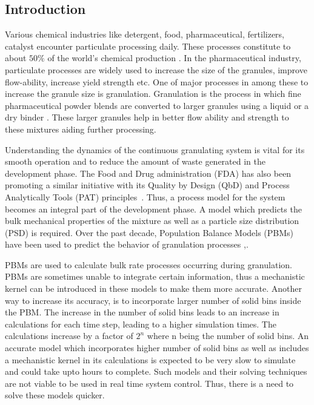 \documentclass[preprint,10pt,authoryear]{elsarticle}
\begin{document}
\begin{linenumbers}
\section{Introduction}
\label{secIntro}
Various chemical industries like detergent, food, pharmaceutical, fertilizers, catalyst encounter particulate processing daily. 
These processes constitute to about $50\%$ of the world's chemical production \citep{seville1997}.
In the pharmaceutical industry, particulate processes are widely used to increase 
the size of the granules, improve flow-ability, increase yield strength etc. One of 
major processes in among these to increase the granule size is granulation. 
Granulation is the process in which fine pharmaceutical powder 
blends are converted to larger granules using a liquid or a dry binder \citep{Chaturbedi2017}. 
These larger granules help in better flow ability and strength to these mixtures 
aiding further processing. 


Understanding the dynamics of the continuous granulating system is vital for its smooth 
operation and to reduce the amount of waste generated in the development phase. The Food 
and Drug administration (FDA) has also been promoting a similar initiative with its 
Quality by Design (QbD) and Process Analytically Tools (PAT) principles~\citep{sen2014}. 
Thus, a process model for the system becomes an integral part of the development phase. 
A model which predicts the bulk mechanical properties of the mixture as well as a particle size 
distribution (PSD) is required. Over the past decade, Population Balance Models (PBMs) have been used 
to predict the behavior of granulation processes \citep{Barrasso2013},\citep{Ramachandran2009}. 

PBMs are used to calculate bulk rate processes occurring during granulation. PBMs are sometimes 
unable to integrate certain information, thus a mechanistic kernel can be 
introduced in these models to make them more accurate. Another way to increase its accuracy, 
is to incorporate larger number of solid bins inside the PBM. The increase in the number of 
solid bins leads to an increase in calculations for each time step, leading to a higher 
simulation times. The calculations increase by a factor of $2^n$ where n being the number 
of solid bins. An accurate model which incorporates higher number of solid bins as well as 
includes a mechanistic kernel in its calculations is expected to be very 
slow to simulate and could take upto hours to complete. Such models and their solving 
techniques are not viable to be used in real time system control. Thus, there is a need to 
solve these models quicker.


\end{linenumbers}
\end{document}
